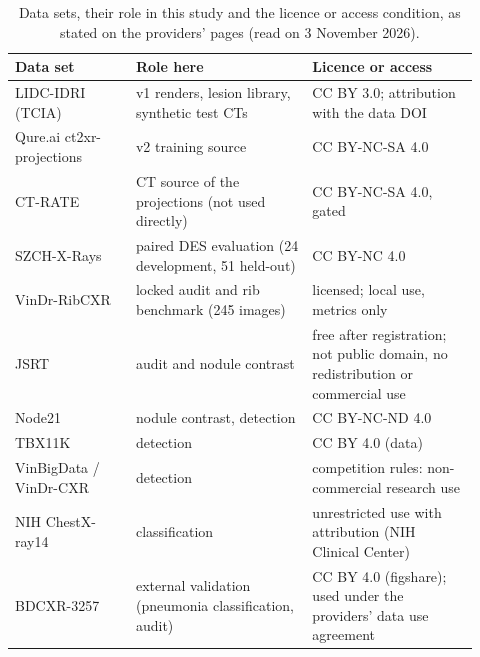 \begin{table}[htbp]
\centering\small
\renewcommand{\arraystretch}{1.15}
\caption{Data sets, their role in this study and the licence or access condition, as stated on the providers' pages (read on
3 November 2026).}
\label{tab:data}
\begin{tabular}{@{}p{0.24\linewidth}p{0.35\linewidth}p{0.33\linewidth}@{}}
\toprule
Data set & Role here & Licence or access \\
\midrule
LIDC-IDRI (TCIA) & v1 renders, lesion library, synthetic test CTs & CC BY 3.0; attribution with the data DOI \\
Qure.ai ct2xr-projections & v2 training source & CC BY-NC-SA 4.0 \\
CT-RATE & CT source of the projections (not used directly) & CC BY-NC-SA 4.0, gated \\
SZCH-X-Rays & paired DES evaluation (24 development, 51 held-out) & CC BY-NC 4.0 \\
VinDr-RibCXR & locked audit and rib benchmark (245 images) & licensed; local use, metrics only \\
JSRT & audit and nodule contrast & free after registration; not public domain, no redistribution or commercial use \\
Node21 & nodule contrast, detection & CC BY-NC-ND 4.0 \\
TBX11K & detection & CC BY 4.0 (data) \\
VinBigData / VinDr-CXR & detection & competition rules: non-commercial research use \\
NIH ChestX-ray14 & classification & unrestricted use with attribution (NIH Clinical Center) \\
BDCXR-3257 & external validation (pneumonia classification, audit) & CC BY 4.0 (figshare); used under the providers' data use agreement \\
\bottomrule
\end{tabular}
\end{table}
